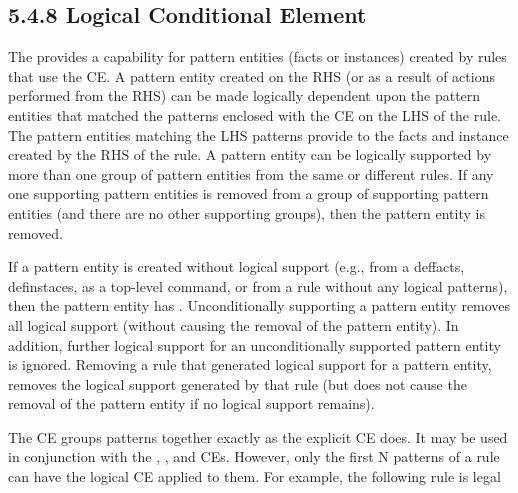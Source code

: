 \documentclass[letterpaper,10pt,english]{sphinxmanual}
\begin{document}
\subsection{5.4.8 Logical Conditional Element}
\label{\detokenize{defrule:logical-conditional-element}}
The   provides a 
capability for pattern entities (facts or instances) created by rules
that use the  CE. A pattern entity created on the RHS (or as
a result of actions performed from the RHS) can be made logically
dependent upon the pattern entities that matched the patterns enclosed
with the  CE on the LHS of the rule. The pattern entities
matching the LHS  patterns provide  to the
facts and instance created by the RHS of the rule. A pattern entity can
be logically supported by more than one group of pattern entities from
the same or different rules. If any one supporting pattern entities is
removed from a group of supporting pattern entities (and there are no
other supporting groups), then the pattern entity is removed.

If a pattern entity is created without logical support (e.g., from a
deffacts, definstaces, as a top-level command, or from a rule without
any logical patterns), then the pattern entity has . Unconditionally supporting a pattern entity removes all
logical support (without causing the removal of the pattern entity). In
addition, further logical support for an unconditionally supported
pattern entity is ignored. Removing a rule that generated logical
support for a pattern entity, removes the logical support generated by
that rule (but does not cause the removal of the pattern entity if no
logical support remains).


\begin{sphinxVerbatim}[commandchars=\\\{\}]
   
\end{sphinxVerbatim}

The  CE groups patterns together exactly as the explicit
 CE does. It may be used in conjunction with the , ,
and  CEs. However, only the first N patterns of a rule can have
the logical CE applied to them. For example, the following rule is legal
\end{document}

